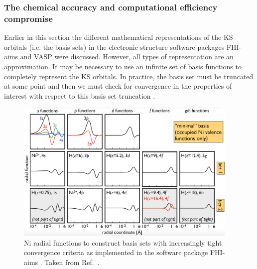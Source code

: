 \documentclass[11pt, twoside]{report}
\begin{document}
\subsubsection{The chemical accuracy and computational efficiency compromise}\label{chem_acc_vs_eff}
Earlier in this section the different mathematical representations of the KS orbitals (i.e. the basis sets) in the electronic structure software packages FHI-aims and VASP were discussed. However, all types of representation are an approximation. It may be necessary to use an infinite set of basis functions to completely represent the KS orbitals. In practice, the basis set must be truncated at some point and then we must check for convergence in the properties of interest with respect to this basis set truncation \cite{Prasad_ch6}. 

\begin{figure}[h!]
  \centering
    \includegraphics[width=0.95\textwidth]{figures/FHI-aims_tiers.png}
    \caption[Ni radial functions to construct basis sets with increasingly tight convergence criteria as implemented in the software package FHI-aims.]{Ni radial functions to construct basis sets with increasingly tight convergence criteria as implemented in the software package FHI-aims \cite{FHI-aims}. Taken from Ref.~.}
  \label{FHI-aims_tiers}
\end{figure}
\end{document}
